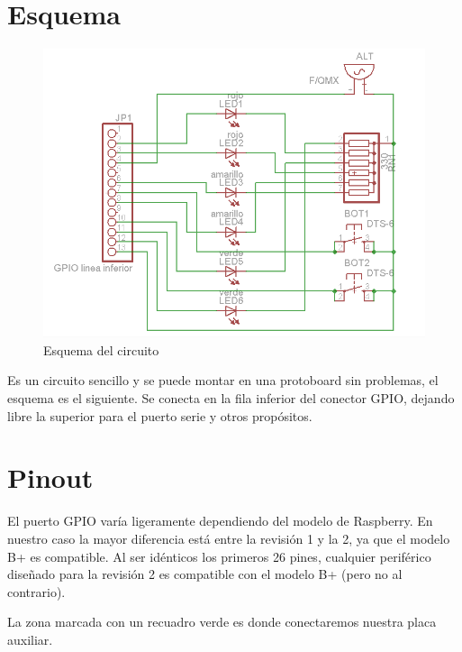 

\label{chp:PlacaAux}
\minitoc

\section{Esquema}

\begin{figure}[h]
  \centering
    \includegraphics[width=14cm]{graphs/circuito.png}
  \caption{Esquema del circuito}
  \label{fig:circuito}
\end{figure}

Es un circuito sencillo y se puede montar en una protoboard sin
problemas, el esquema es el siguiente. Se conecta en la fila
inferior del conector GPIO, dejando libre la superior para el puerto
serie y otros propósitos.

\section{Pinout}

El puerto GPIO varía ligeramente dependiendo del modelo de Raspberry. En nuestro caso
la mayor diferencia está entre la revisión 1 y la 2, ya que el modelo B+ es compatible.
Al ser idénticos los primeros 26 pines, cualquier periférico diseñado para la revisión 2
es compatible con el modelo B+ (pero no al contrario).

La zona marcada con un recuadro verde es donde conectaremos nuestra placa auxiliar.

